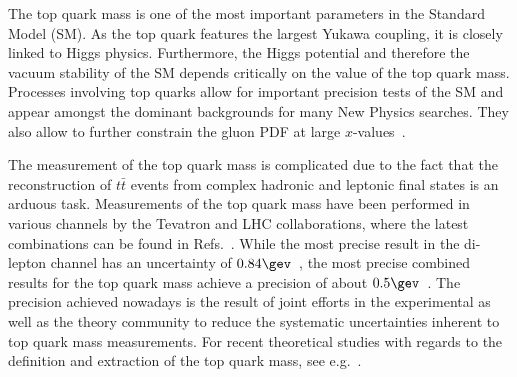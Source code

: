 

The top quark mass is one of the most important parameters in the
Standard Model (SM). As the top quark features the largest Yukawa coupling, 
it is closely linked to Higgs physics. Furthermore, 
the Higgs potential and therefore the vacuum stability
of the SM depends critically on the value of the top quark mass.
Processes involving top quarks allow for important precision tests of
the SM and appear amongst the dominant backgrounds for 
many New Physics searches. They also allow to further constrain the
gluon PDF at large $x$-values~\cite{Czakon:2013tha,Guzzi:2014wia,delDuca:2015gca,Czakon:2016olj}.

The measurement of the top quark mass is  complicated  due to the fact that
the reconstruction of $t\bar{t}$ events from complex hadronic and
leptonic final states is an arduous task.
Measurements of the top quark mass have been performed in various
channels by the Tevatron and LHC collaborations, where the latest
combinations can be found in Refs.~\cite{CDF-1402,Abazov:2017ktz,ATLAS-CONF-2017-071,Khachatryan:2015hba}.
While the most precise result in the di-lepton channel has an uncertainty of
$0.84\gev$~\cite{Aaboud:2016igd}, the most precise combined results for the
top quark mass achieve a precision of
about $0.5\gev$~\cite{Khachatryan:2015hba,ATLAS-CONF-2017-071}.
The precision achieved nowadays is the result of joint efforts in the experimental as well as the
theory community to reduce the systematic uncertainties inherent to top quark mass measurements.
%
For recent theoretical studies with regards to the definition and
extraction of the top quark mass, see e.g.~\cite{Frixione:2014ala,Beneke:2016cbu,Butenschoen:2016lpz,Kawabata:2016aya,Hoang:2017suc,Hoang:2017btd,Hoang:2017kmk,Bevilacqua:2017ipv,Corcella:2017rpt,Ravasio:2018lzi}.

